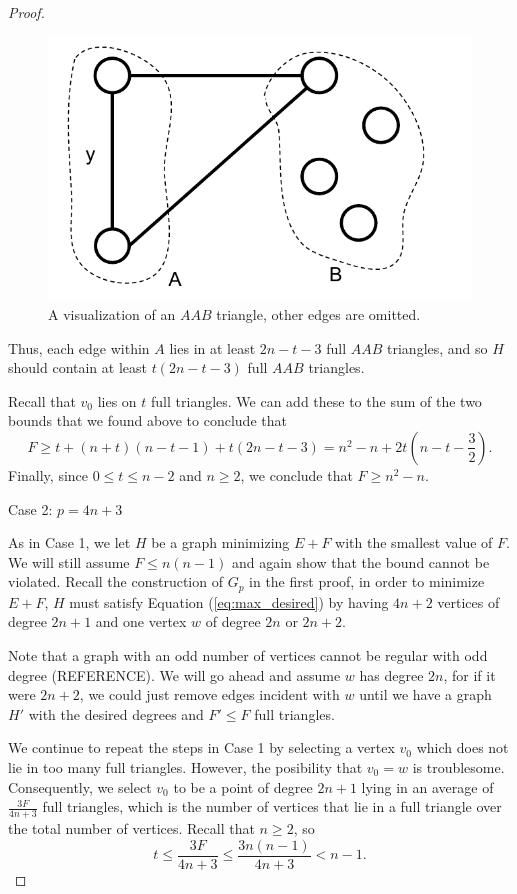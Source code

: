 \documentclass[10pt]{amsart}
\begin{document}
\begin{proof}
    \begin{figure}[h!]
        \centering
        \includegraphics[scale=.7]{../figures/aab_triangle.pdf}
        \caption{A visualization of an $AAB$ triangle, other edges are omitted.}
    \end{figure}

    Thus, each edge within $A$ lies in at least $2n - t - 3$ full $AAB$ triangles, and so $H$ should 
    contain at least $t(2n - t - 3)$ full $AAB$ triangles.

    Recall that $v_0$ lies on $t$ full triangles. We can add these to the sum of the two bounds that
    we found above to conclude that
    $$ F \ge t + (n + t)(n - t - 1) + t(2n - t - 3) = n^2 - n + 2t(n - t - \frac{3}{2}). $$
    Finally, since $0 \le t \le n - 2$ and $n \ge 2$, we conclude that $F \ge n^2 - n$.

    \noindent Case 2: $p = 4n + 3$

    As in Case 1, we let $H$ be a graph minimizing $E + F$ with the smallest value of $F$. We 
    will still assume $F \le n(n - 1)$ and again show that the bound cannot be violated. Recall 
    the construction of $G_p$ in the first proof, in order to minimize $E + F$, $H$ must satisfy
    Equation (\ref{eq:max_desired}) by having $4n + 2$ vertices of degree $2n + 1$ and one vertex 
    $w$ of degree $2n$ or $2n + 2$.
    
    Note that a graph with an odd number of vertices cannot be regular 
    with odd degree (REFERENCE). We will go ahead and assume $w$ has degree $2n$, for if it were 
    $2n + 2$, we could just remove edges incident with $w$ until we have a graph $H'$ with the desired 
    degrees and $F' \le F$ full triangles.

    We continue to repeat the steps in Case 1 by selecting a vertex $v_0$ which does not lie in too
    many full triangles. However, the posibility that $v_0 = w$ is troublesome. Consequently, we select 
    $v_0$ to be a point of degree $2n + 1$ lying in an average of $\frac{3F}{4n + 3}$ 
    full triangles, which is the number of vertices that lie in a full triangle over the total number
    of vertices. Recall that $n \ge 2$, so
    \begin{equation}
        t \le \frac{3F}{4n + 3} \le \frac{3n(n - 1)}{4n + 3} < n - 1 \label{eq:t_case_2}.
    \end{equation}


\end{proof}
\end{document}
